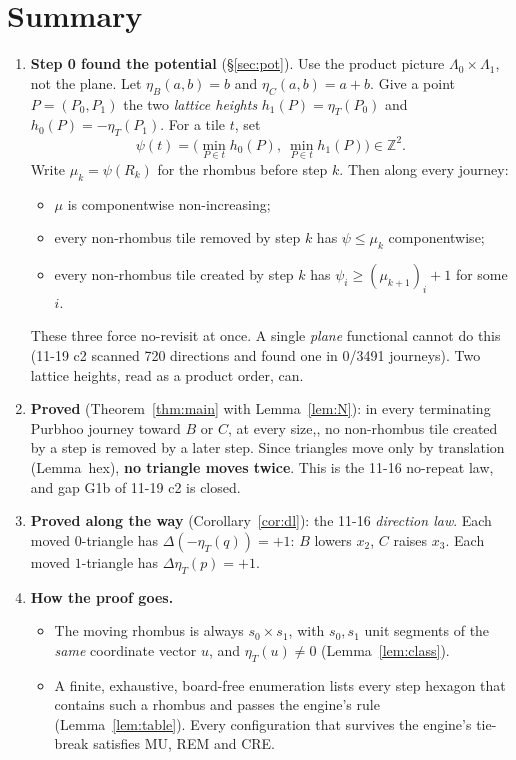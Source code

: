 \documentclass[11pt]{article}
\theoremstyle{definition}\newtheorem{definition}[theorem]{Definition}\newtheorem{remark}[theorem]{Remark}
\newcommand{\Z}{\mathbb Z}
\begin{document}
\section*{Summary}
\begin{enumerate}
\item \textbf{Step 0 found the potential} (\S\ref{sec:pot}). Use the product picture $\Lambda_0\times\Lambda_1$, not the plane. Let $\eta_B(a,b)=b$ and $\eta_C(a,b)=a+b$. Give a point $P=(P_0,P_1)$ the two \emph{lattice heights} $h_1(P)=\eta_T(P_0)$ and $h_0(P)=-\eta_T(P_1)$. For a tile $t$, set
\[\psi(t)=\bigl(\min_{P\in t}h_0(P),\ \min_{P\in t}h_1(P)\bigr)\in\Z^2.\]
Write $\mu_k=\psi(R_k)$ for the rhombus before step $k$. Then along every journey:
\begin{itemize}
\item[(MU)] $\mu$ is componentwise non-increasing;
\item[(REM)] every non-rhombus tile removed by step $k$ has $\psi\le\mu_k$ componentwise;
\item[(CRE)] every non-rhombus tile created by step $k$ has $\psi_i\ge(\mu_{k+1})_i+1$ for some $i$.
\end{itemize}
These three force no-revisit at once. A single \emph{plane} functional cannot do this (11-19 c2 scanned 720 directions and found one in 0/3491 journeys). Two lattice heights, read as a product order, can.
\item \textbf{Proved} (Theorem~\ref{thm:main} with Lemma~\ref{lem:N}): in every terminating Purbhoo journey toward $B$ or $C$, at every size,, no non-rhombus tile created by a step is removed by a later step. Since triangles move only by translation (Lemma~hex), \textbf{no triangle moves twice}. This is the 11-16 no-repeat law, and gap G1b of 11-19 c2 is closed.
\item \textbf{Proved along the way} (Corollary~\ref{cor:dl}): the 11-16 \emph{direction law}. Each moved $0$-triangle has $\Delta(-\eta_T(q))=+1$: $B$ lowers $x_2$, $C$ raises $x_3$. Each moved $1$-triangle has $\Delta\eta_T(p)=+1$.
\item \textbf{How the proof goes.}
\begin{itemize}
\item The moving rhombus is always $s_0\times s_1$, with $s_0,s_1$ unit segments of the \emph{same} coordinate vector $u$, and $\eta_T(u)\ne0$ (Lemma~\ref{lem:class}).
\item A finite, exhaustive, board-free enumeration lists every step hexagon that contains such a rhombus and passes the engine's rule (Lemma~\ref{lem:table}). Every configuration that survives the engine's tie-break satisfies MU, REM and CRE.

\end{itemize}
\end{enumerate}
\end{document}
